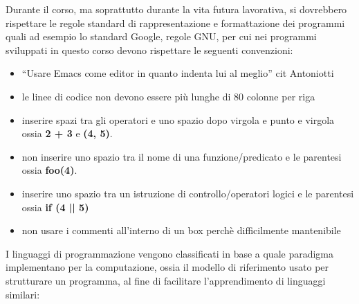 \documentclass[a4paper]{book}
\begin{document}
Durante il corso, ma soprattutto durante la vita futura lavorativa, si dovrebbero rispettare le regole
standard di rappresentazione e formattazione dei programmi quali ad esempio lo standard Google, regole GNU, per cui nei programmi
sviluppati in questo corso devono rispettare le seguenti convenzioni:
\begin{itemize}
\item ``Usare Emacs come editor in quanto indenta lui al meglio'' cit Antoniotti
\item le linee di codice non devono essere più lunghe di 80 colonne per riga
\item inserire spazi tra gli operatori e uno spazio dopo virgola  e punto e virgola  ossia \textbf{2 + 3} e \textbf{(4, 5)}.
\item non inserire uno spazio tra il nome di una funzione/predicato e le parentesi ossia \textbf{foo(4)}.
\item inserire uno spazio tra un istruzione di controllo/operatori logici e le parentesi ossia \textbf{if (4 || 5)}
\item non usare i commenti all'interno di un box perchè difficilmente mantenibile
\end{itemize}
I linguaggi di programmazione vengono classificati in base a quale paradigma implementano per la computazione, ossia il modello di riferimento
usato per strutturare un programma, al fine di facilitare l'apprendimento di linguaggi similari:
\end{document}

